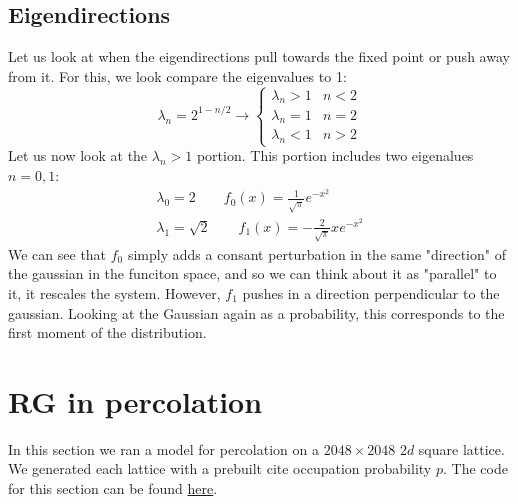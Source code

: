 \documentclass{article}
\begin{document}
\subsection{Eigendirections}
Let us look at when the eigendirections pull towards the fixed point or push away from it. For this, we look compare the eigenvalues to 1:
\begin{equation}
    \lambda_n = 2^{1-n/2} \rightarrow \begin{cases}
        \lambda_n > 1 & n < 2
        \\
        \lambda_n = 1 & n = 2
        \\
        \lambda_n < 1 & n > 2
    \end{cases}
\end{equation}
Let us now look at the $\lambda_n > 1$ portion. This portion includes two eigenalues $n=0,1$:
\begin{equation}
\begin{gathered}
    \lambda_0 = 2 \qquad f_0(x) = \frac{1}{\sqrt{\pi}}e^{-x^2}
    \\
    \lambda_1 = \sqrt{2} \qquad f_1(x) = -\frac{2}{\sqrt{\pi}}xe^{-x^2}
\end{gathered}
\end{equation}
We can see that $f_0$ simply adds a consant perturbation in the same "direction" of the gaussian in the funciton space, and so we can think about it as "parallel" to it, it rescales the system. However, $f_1$ pushes in a direction perpendicular to the gaussian. Looking at the Gaussian again as a probability, this corresponds to the first moment of the distribution.

\section{RG in percolation}
In this section we ran a model for percolation on a $2048\times2048$ $2d$ square lattice. We generated each lattice with a prebuilt cite occupation probability $p$. The code for this section can be found \href{https://raw.githubusercontent.com/idanstark42/masters-homework/refs/heads/master/sm1/ex5/precolation.py}{here}.
\end{document}
